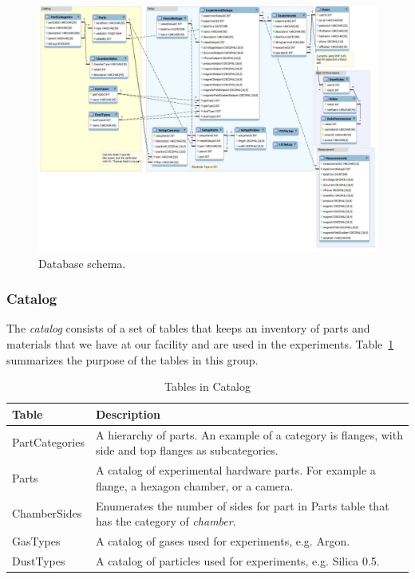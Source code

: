 \begin{figure}[h!]
\centering
\includegraphics[width=6in]{schema.pdf}
\caption{Database schema.\label{fig:schema}}
\end{figure}


\subsubsection{Catalog}

The \emph{catalog} consists of a set of tables that keeps an inventory of parts and materials that we have at our facility and are used in the experiments. Table~\ref{tb_tables_in_catalog} summarizes the purpose of the tables in this group.

\begin{table}[h!]
\centering
\caption{Tables in Catalog}\label{tb_tables_in_catalog}
\begin{tabular}{l p{12cm}} \hline
{\bf Table}         & {\bf Description}\\ \hline
PartCategories  & A hierarchy of parts. An example of a category is flanges, with side and top flanges as subcategories.\\ \hline
Parts           & A catalog of experimental hardware parts. For example a flange, a hexagon chamber, or a camera.\\ \hline
ChamberSides    & Enumerates the number of sides for part in Parts table that has the category of \emph{chamber}. \\ \hline
GasTypes        & A catalog of gases used for experiments, e.g. Argon. \\ \hline
DustTypes       & A catalog of particles used for experiments, e.g. Silica 0.5.\\ \hline
\end{tabular}
\end{table}


